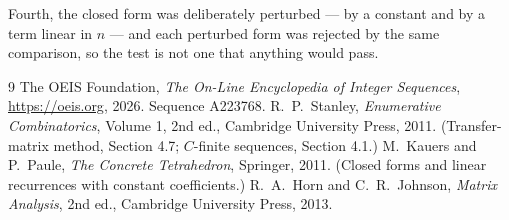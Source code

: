 \documentclass[11pt,a4paper]{article}
\theoremstyle{plain}
\theoremstyle{definition}
\begin{document}
Fourth, the closed form was deliberately perturbed --- by a constant and by a term linear in
$n$ --- and each perturbed form was rejected by the same comparison, so the test is not one
that anything would pass.

\begin{thebibliography}{9}
 The OEIS Foundation, \emph{The On-Line Encyclopedia of Integer
Sequences}, \url{https://oeis.org}, 2026. Sequence A223768.
 R.~P.~Stanley, \emph{Enumerative Combinatorics}, Volume 1, 2nd ed.,
Cambridge University Press, 2011. (Transfer-matrix method, Section 4.7; $C$-finite sequences,
Section 4.1.)
 M.~Kauers and P.~Paule, \emph{The Concrete Tetrahedron}, Springer, 2011.
(Closed forms and linear recurrences with constant coefficients.)
 R.~A.~Horn and C.~R.~Johnson, \emph{Matrix Analysis}, 2nd ed., Cambridge
University Press, 2013.
\end{thebibliography}
\end{document}
